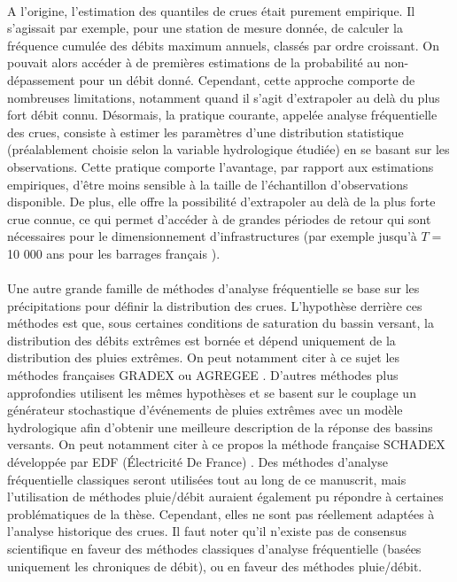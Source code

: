 \documentclass[11pt]{article}
\begin{document}
	\paragraph{} A l'origine, l'estimation des quantiles de crues était purement empirique. Il s'agissait par exemple, pour une station de mesure donnée, de calculer la fréquence cumulée des débits maximum annuels, classés par ordre croissant. On pouvait alors accéder à de premières estimations de la probabilité au non-dépassement pour un débit donné. Cependant, cette approche comporte de nombreuses limitations, notamment quand il s'agit d'extrapoler au delà du plus fort débit connu. Désormais, la pratique courante, appelée analyse fréquentielle des crues, consiste à estimer les paramètres d'une distribution statistique (préalablement choisie selon la variable hydrologique étudiée) en se basant sur les observations. Cette pratique comporte l'avantage, par rapport aux estimations empiriques, d'être moins sensible à la taille de l'échantillon d'observations disponible. De plus, elle offre la possibilité d'extrapoler au delà de la plus forte crue connue, ce qui permet d'accéder à de grandes périodes de retour qui sont nécessaires pour le dimensionnement d'infrastructures (par exemple jusqu'à $T =$ 10 000 ans pour les barrages français \citep{le_delliou_recommandations_2014}). 

	\paragraph{} Une autre grande famille de méthodes d'analyse fréquentielle se base sur les précipitations pour définir la distribution des crues. L'hypothèse derrière ces méthodes est que, sous certaines conditions de saturation du bassin versant, la distribution des débits extrêmes est bornée et dépend uniquement de la distribution des pluies extrêmes. On peut notamment citer à ce sujet les méthodes françaises GRADEX \citep{guillot_methode_1967} ou AGREGEE \citep{margoum_estimation_1994}. D'autres méthodes plus approfondies utilisent les mêmes hypothèses et se basent sur le couplage un générateur stochastique d'événements de pluies extrêmes avec un modèle hydrologique afin d'obtenir une meilleure description de la réponse des bassins versants. On peut notamment citer à ce propos la méthode française SCHADEX développée par EDF (Électricité De France) \citep{paquet_schadex_2013}. Des méthodes d'analyse fréquentielle classiques seront utilisées tout au long de ce manuscrit, mais l'utilisation de méthodes pluie/débit auraient également pu répondre à certaines problématiques de la thèse. Cependant, elles ne sont pas réellement adaptées à l'analyse historique des crues. Il faut noter qu'il n'existe pas de consensus scientifique en faveur des méthodes classiques d'analyse fréquentielle (basées uniquement les chroniques de débit), ou en faveur des méthodes pluie/débit.
				
\end{document}
